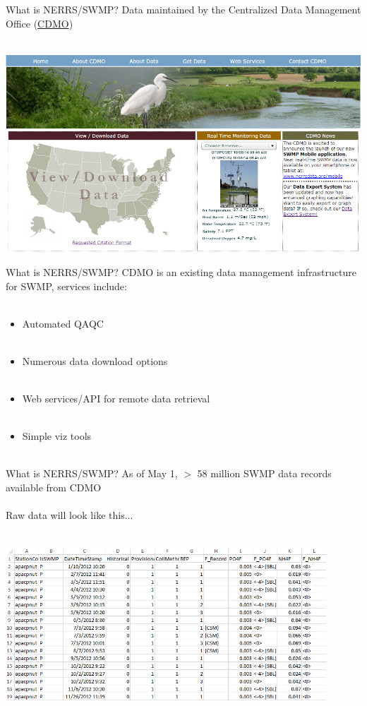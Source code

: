 \documentclass[serif]{beamer}\usepackage[]{graphicx}\usepackage[]{color}
\begin{document}
\begin{frame}[t]{What is NERRS/SWMP?}
Data maintained by the Centralized Data Management Office (\href{http://cdmo.baruch.sc.edu/}{CDMO})\\~\\
\centerline{\includegraphics[width = \textwidth]{fig/cdmo_front.png}}
\end{frame}

\begin{frame}{What is NERRS/SWMP?}
CDMO is an existing data management infrastructure for SWMP, services include:\\~\\
\begin{itemize}
\item Automated QAQC \\~\\
\item Numerous data download options \\~\\
\item Web services/API for remote data retrieval \\~\\
\item Simple viz tools \\~\\
\end{itemize}
\end{frame}

\begin{frame}[t]{What is NERRS/SWMP?}
As of May 1, $>$ 58 million SWMP data records available from CDMO\\~\\
Raw data will look like this...\\~\\
\centerline{\includegraphics[width = 0.9\textwidth]{fig/qaqc_ex.png}}
\end{frame}
\end{document}
